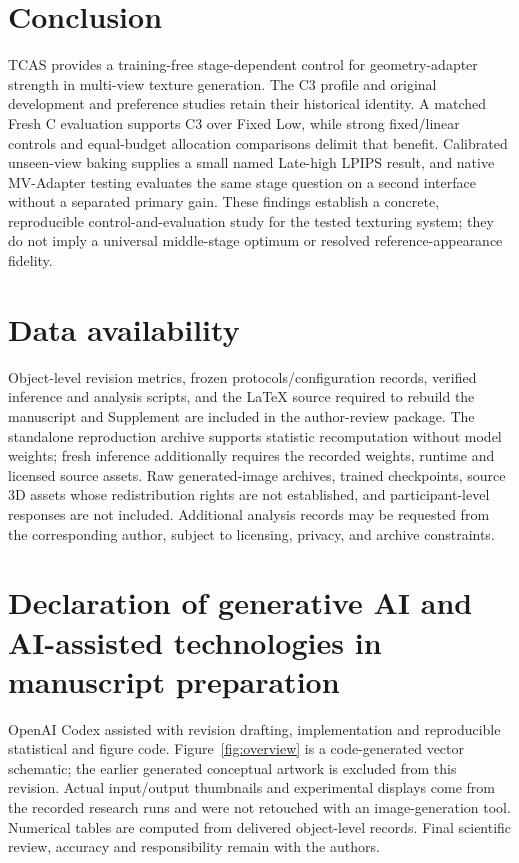 \documentclass[times,twocolumn,final]{elsarticle}
\begin{document}
\section{Conclusion}
\label{sec:conclusion}
TCAS provides a training-free stage-dependent control for geometry-adapter strength in multi-view texture generation. The C3 profile and original development and preference studies retain their historical identity. A matched Fresh C evaluation supports C3 over Fixed Low, while strong fixed/linear controls and equal-budget allocation comparisons delimit that benefit. Calibrated unseen-view baking supplies a small named Late-high LPIPS result, and native MV-Adapter testing evaluates the same stage question on a second interface without a separated primary gain. These findings establish a concrete, reproducible control-and-evaluation study for the tested texturing system; they do not imply a universal middle-stage optimum or resolved reference-appearance fidelity.

\section*{Data availability}

Object-level revision metrics, frozen protocols/configuration records, verified inference and analysis scripts, and the LaTeX source required to rebuild the manuscript and Supplement are included in the author-review package. The standalone reproduction archive supports statistic recomputation without model weights; fresh inference additionally requires the recorded weights, runtime and licensed source assets. Raw generated-image archives, trained checkpoints, source 3D assets whose redistribution rights are not established, and participant-level responses are not included. Additional analysis records may be requested from the corresponding author, subject to licensing, privacy, and archive constraints.

\section*{Declaration of generative AI and AI-assisted technologies in manuscript preparation}
OpenAI Codex assisted with revision drafting, implementation and reproducible statistical and figure code. Figure~\ref{fig:overview} is a code-generated vector schematic; the earlier generated conceptual artwork is excluded from this revision. Actual input/output thumbnails and experimental displays come from the recorded research runs and were not retouched with an image-generation tool. Numerical tables are computed from delivered object-level records. Final scientific review, accuracy and responsibility remain with the authors.
\end{document}
